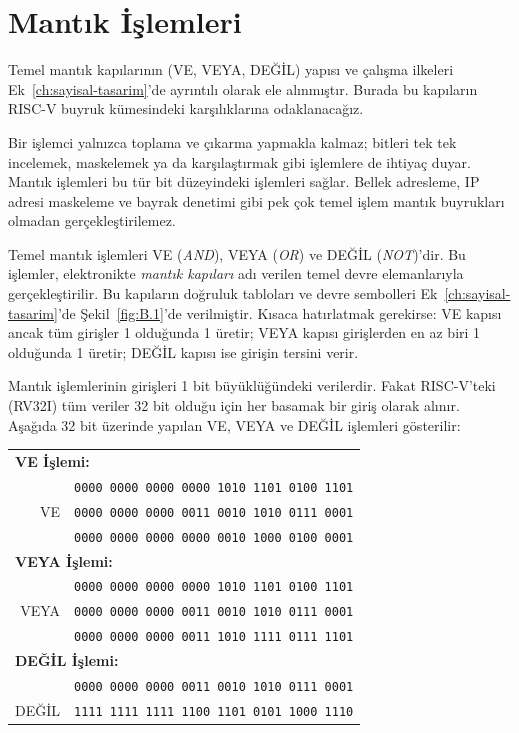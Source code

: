 \section{Mantık İşlemleri}
\label{sec:mantik-islemleri}

Temel mantık kapılarının (VE, VEYA, DEĞİL) yapısı ve çalışma ilkeleri Ek~\ref{ch:sayisal-tasarim}'de ayrıntılı olarak ele alınmıştır. Burada bu kapıların RISC-V buyruk kümesindeki karşılıklarına odaklanacağız.

Bir işlemci yalnızca toplama ve çıkarma yapmakla kalmaz; bitleri tek tek incelemek, maskelemek ya da karşılaştırmak gibi işlemlere de ihtiyaç duyar. Mantık işlemleri bu tür bit düzeyindeki işlemleri sağlar. Bellek adresleme, IP adresi maskeleme ve bayrak denetimi gibi pek çok temel işlem mantık buyrukları olmadan gerçekleştirilemez.

Temel mantık işlemleri VE (\emph{AND}), VEYA (\emph{OR}) ve DEĞİL (\emph{NOT})'dir. Bu işlemler, elektronikte \emph{mantık kapıları} adı verilen temel devre elemanlarıyla gerçekleştirilir. Bu kapıların doğruluk tabloları ve devre sembolleri Ek~\ref{ch:sayisal-tasarim}'de Şekil~\ref{fig:B.1}'de verilmiştir. Kısaca hatırlatmak gerekirse: VE kapısı ancak tüm girişler 1 olduğunda 1 üretir; VEYA kapısı girişlerden en az biri 1 olduğunda 1 üretir; DEĞİL kapısı ise girişin tersini verir.

Mantık işlemlerinin girişleri 1 bit büyüklüğündeki verilerdir. Fakat RISC-V'teki (RV32I) tüm veriler 32 bit olduğu için her basamak bir giriş olarak alınır. Aşağıda 32 bit üzerinde yapılan VE, VEYA ve DEĞİL işlemleri gösterilir:

\begin{center}
\small
\begin{tabular}{r@{\;\;}l}
  \multicolumn{2}{l}{\textbf{VE İşlemi:}} \\[4pt]
  & \texttt{0000\,0000\,0000\,0000\,1010\,1101\,0100\,1101} \\
  VE & \texttt{0000\,0000\,0000\,0011\,0010\,1010\,0111\,0001} \\
  \midrule
  & \texttt{0000\,0000\,0000\,0000\,0010\,1000\,0100\,0001} \\[12pt]
  \multicolumn{2}{l}{\textbf{VEYA İşlemi:}} \\[4pt]
  & \texttt{0000\,0000\,0000\,0000\,1010\,1101\,0100\,1101} \\
  VEYA & \texttt{0000\,0000\,0000\,0011\,0010\,1010\,0111\,0001} \\
  \midrule
  & \texttt{0000\,0000\,0000\,0011\,1010\,1111\,0111\,1101} \\[12pt]
  \multicolumn{2}{l}{\textbf{DEĞİL İşlemi:}} \\[4pt]
  & \texttt{0000\,0000\,0000\,0011\,0010\,1010\,0111\,0001} \\
  \midrule
  DEĞİL & \texttt{1111\,1111\,1111\,1100\,1101\,0101\,1000\,1110} \\
\end{tabular}
\end{center}


